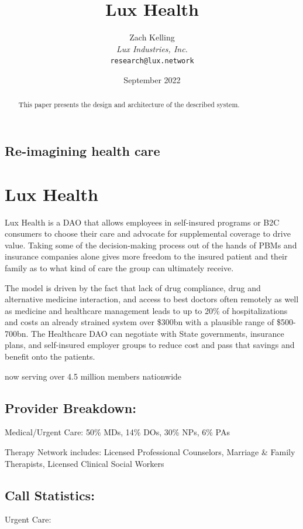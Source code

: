 \documentclass[11pt]{article}
\title{Lux Health}
\author{Zach Kelling\\\textit{Lux Industries, Inc.}\\\texttt{research@lux.network}}
\date{September 2022}
\begin{document}
\luxcoverpage

\begin{abstract}
This paper presents the design and architecture of the described system.
\end{abstract}

\tableofcontents
\newpage


\subsection{Re-imagining health care}

\section{Lux Health}

Lux Health is a DAO that allows employees in self-insured programs or B2C consumers to choose their care and advocate for supplemental coverage to drive value. Taking some of the decision-making process out of the hands of PBMs and insurance companies alone gives more freedom to the insured patient and their family as to what kind of care the group can ultimately receive.


The model is driven by the fact that lack of drug compliance, drug and alternative medicine interaction, and access to best doctors often remotely as well as medicine and healthcare management leads to up to 20\% of hospitalizations and costs an already strained system over \$300bn with a plausible range of \$500- 700bn. The Healthcare DAO can negotiate with State governments, insurance plans, and self-insured employer groups to reduce cost and pass that savings and benefit onto the patients.


now serving over 4.5 million members nationwide


\subsection{Provider Breakdown:}

Medical/Urgent Care: 50\% MDs, 14\% DOs, 30\% NPs, 6\% PAs


Therapy Network includes: Licensed Professional Counselors, Marriage \& Family Therapists, Licensed Clinical Social Workers


\subsection{Call Statistics:}

Urgent Care:
\end{document}
